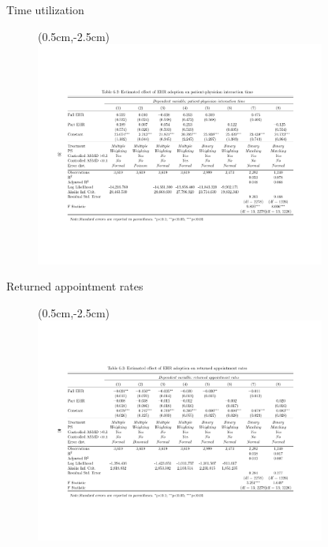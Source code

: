 \documentclass[10pt, compress]{beamer}
\begin{document}
\begin{frame}{Time utilization}

\begin{figure}
\centering
\begin{textblock*}{8.5cm}(0.5cm,-2.5cm)
   \includegraphics[width= 0.85\textwidth]{62.pdf}
\end{textblock*}
\end{figure}


\end{frame}

\begin{frame}{Returned appointment rates}

\begin{figure}
\centering
\begin{textblock*}{8.5cm}(0.5cm,-2.5cm)
   \includegraphics[width= 0.85\textwidth]{63.pdf}
\end{textblock*}
\end{figure}


\end{frame}
\end{document}
